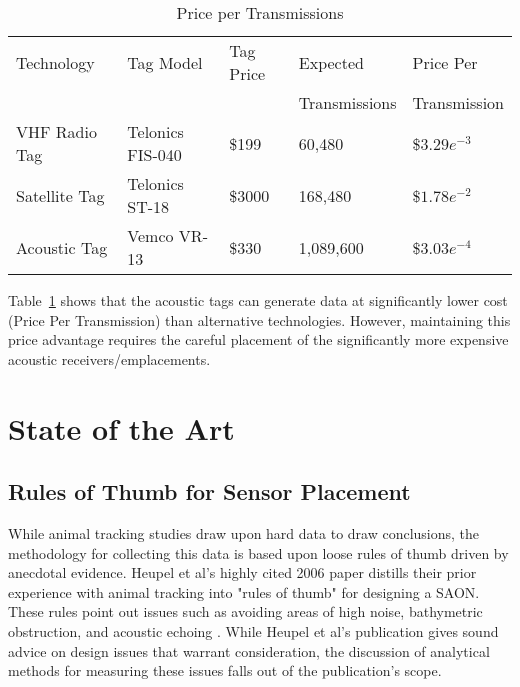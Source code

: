 \begin{table}[ht]
	\begin{tabular}{l l l l l}
		Technology&Tag Model&Tag Price&Expected&Price Per\\
		&&&Transmissions&Transmission\\
		\hline
		VHF Radio Tag		& Telonics FIS-040	& \$199		& 60,480	& \$$3.29e^{-3}$\\
		Satellite Tag		& Telonics ST-18	& \$3000	& 168,480	& \$$1.78e^{-2}$\\
		Acoustic Tag		& Vemco VR-13		& \$330		& 1,089,600	& \$$3.03e^{-4}$\\
	\end{tabular}
	\caption{Price per Transmissions
		\label{PricePerTx}}
\end{table}

Table~\ref{PricePerTx} shows that the acoustic tags can generate data at significantly lower cost (Price Per Transmission) than alternative technologies.  However, maintaining this price advantage requires the careful placement of the significantly more expensive acoustic receivers/emplacements.  






\section{State of the Art}

\subsection{Rules of Thumb for Sensor Placement}
\label{RulesOfThumb}
While animal tracking studies draw upon hard data to draw conclusions, the methodology for collecting this data is based upon loose rules of thumb driven by anecdotal evidence.  Heupel et al's highly cited 2006 paper distills their prior experience with animal tracking into "rules of thumb" for designing a SAON.  These rules point out issues such as avoiding areas of high noise, bathymetric obstruction, and acoustic echoing \cite{Heupel2006}.  While Heupel et al's publication gives sound advice on design issues that warrant consideration, the discussion of analytical methods for measuring these issues falls out of the publication's scope.


